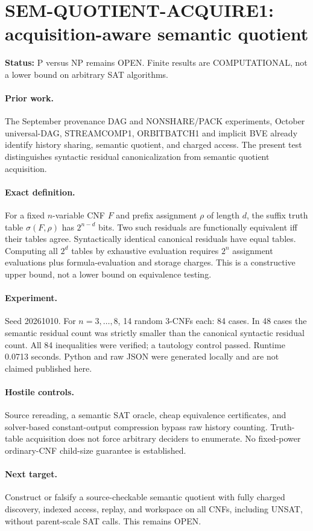 \documentclass{article}
\begin{document}
\section*{SEM-QUOTIENT-ACQUIRE1: acquisition-aware semantic quotient}
\textbf{Status:} P versus NP remains OPEN. Finite results are COMPUTATIONAL, not a lower bound on arbitrary SAT algorithms.
\paragraph{Prior work.} The September provenance DAG and NONSHARE/PACK experiments, October universal-DAG, STREAMCOMP1, ORBITBATCH1 and implicit BVE already identify history sharing, semantic quotient, and charged access. The present test distinguishes syntactic residual canonicalization from semantic quotient acquisition.
\paragraph{Exact definition.} For a fixed $n$-variable CNF $F$ and prefix assignment $\rho$ of length $d$, the suffix truth table $\sigma(F,\rho)$ has $2^{n-d}$ bits. Two such residuals are functionally equivalent iff their tables agree. Syntactically identical canonical residuals have equal tables. Computing all $2^d$ tables by exhaustive evaluation requires $2^n$ assignment evaluations plus formula-evaluation and storage charges. This is a constructive upper bound, not a lower bound on equivalence testing.
\paragraph{Experiment.} Seed 20261010. For $n=3,\ldots,8$, 14 random 3-CNFs each: 84 cases. In 48 cases the semantic residual count was strictly smaller than the canonical syntactic residual count. All 84 inequalities were verified; a tautology control passed. Runtime 0.0713 seconds. Python and raw JSON were generated locally and are not claimed published here.
\paragraph{Hostile controls.} Source rereading, a semantic SAT oracle, cheap equivalence certificates, and solver-based constant-output compression bypass raw history counting. Truth-table acquisition does not force arbitrary deciders to enumerate. No fixed-power ordinary-CNF child-size guarantee is established.
\paragraph{Next target.} Construct or falsify a source-checkable semantic quotient with fully charged discovery, indexed access, replay, and workspace on all CNFs, including UNSAT, without parent-scale SAT calls. This remains OPEN.
\end{document}
